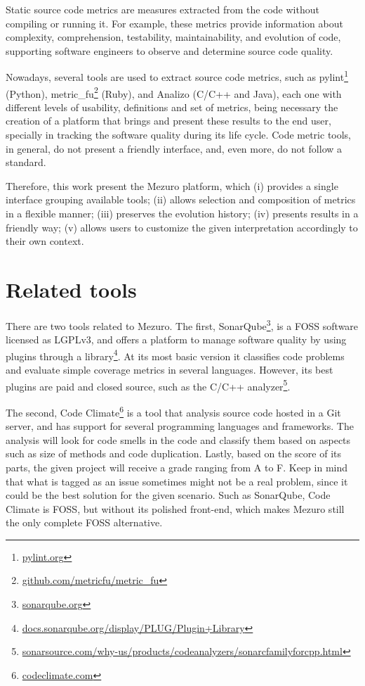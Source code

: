 \documentclass{llncs}
\begin{document}
Static source code metrics are measures extracted from the code without
compiling or running it. For example, these metrics provide information about
complexity, comprehension, testability, maintainability, and evolution of code,
supporting software engineers to observe and determine source code
quality\cite{mills1988}.

Nowadays, several tools are used to extract source code metrics, such as
pylint\footnote{\url{pylint.org}} (Python),
metric\_fu\footnote{\url{github.com/metricfu/metric_fu}} (Ruby), and
Analizo (C/C++ and Java)\cite{terceiro2010analizo}, each one with different
levels of usability, definitions and set of metrics, being necessary the
creation of a platform that brings and present these results to the end user,
specially in tracking the software quality during its life cycle. Code metric
tools, in general, do not present a friendly interface, and, even more, do not
follow a standard.

Therefore, this work present the Mezuro platform, which (i) provides a single
interface grouping available tools;
(ii) allows selection and composition of metrics in a flexible manner;
(iii) preserves the evolution history;
(iv) presents results in a friendly way;
(v) allows users to customize the given interpretation accordingly to their own context.

\section{Related tools}

There are two tools related to Mezuro. The first,
SonarQube\footnote{\url{sonarqube.org}}, is a FOSS software
licensed as LGPLv3, and offers a platform to manage software quality by using
plugins through a
library\footnote{\url{docs.sonarqube.org/display/PLUG/Plugin+Library}}.
At its most basic version it classifies code problems and evaluate simple
coverage metrics in several languages. However, its best plugins are paid and
closed source, such as the C/C++
analyzer\footnote{\url{sonarsource.com/why-us/products/codeanalyzers/sonarcfamilyforcpp.html}}.

The second, Code Climate\footnote{\url{codeclimate.com}} is a tool
that analysis source code hosted in a Git server, and has support for several
programming languages and frameworks. The analysis will look for code smells
in the code and classify them based on aspects such as size of methods and
code duplication. Lastly, based on the score of its parts, the given project %
will receive a grade ranging from A to F. Keep in mind that what is tagged as an
issue sometimes might not be a real problem, since it could be the best solution for %
the given scenario. Such as SonarQube, Code Climate is FOSS, but without its
polished front-end, which makes Mezuro still the only complete FOSS alternative.
\end{document}
